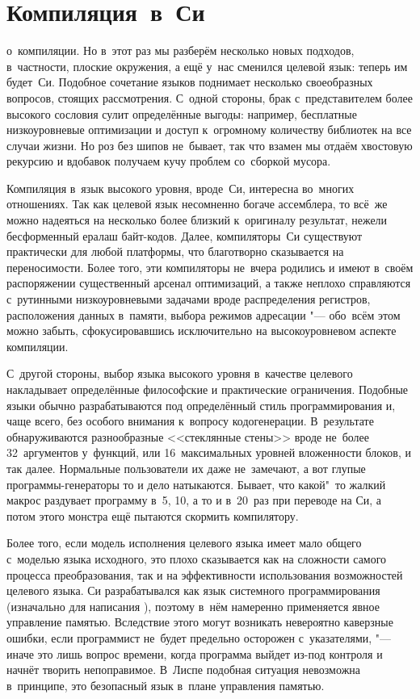 \chapter{Компиляция~в~Си}\label{chapter:cc}

 о~компиляции. Но в~этот
раз мы разберём несколько новых подходов, в~частности, плоские окружения, а ещё
у~нас сменился целевой язык: теперь им будет~Си. Подобное сочетание языков
поднимает несколько своеобразных вопросов, стоящих рассмотрения. С~одной
стороны, брак с~представителем более высокого сословия сулит определённые
выгоды: например, бесплатные низкоуровневые оптимизации и доступ к~огромному
количеству библиотек на все случаи жизни. Но роз без шипов не~бывает, так что
взамен мы отдаём хвостовую рекурсию и вдобавок получаем кучу проблем со~сборкой
мусора.

\bigskip

Компиляция в~язык высокого уровня, вроде~Си, интересна во~многих отношениях. Так
как целевой язык несомненно богаче ассемблера, то всё~же можно надеяться на
несколько более близкий к~оригиналу результат, нежели бесформенный ералаш
байт-кодов. Далее, компиляторы~Си существуют практически для любой платформы,
что благотворно сказывается на переносимости. Более того, эти компиляторы
не~вчера родились и имеют в~своём распоряжении существенный арсенал оптимизаций,
а также неплохо справляются с~рутинными низкоуровневыми задачами вроде
распределения регистров, расположения данных в~памяти, выбора режимов адресации
"--- обо~всём этом можно забыть, сфокусировавшись исключительно на
высокоуровневом аспекте компиляции.

С~другой стороны, выбор языка высокого уровня в~качестве целевого накладывает
определённые философские и практические ограничения. Подобные языки обычно
разрабатываются под определённый стиль программирования и, чаще всего, без
особого внимания к~вопросу кодогенерации. В~результате обнаруживаются
разнообразные <<стеклянные стены>> вроде не~более 32~аргументов у~функций, или
16~максимальных уровней вложенности блоков, и так далее. Нормальные пользователи
их даже не~замечают, а вот глупые программы-генераторы то и дело натыкаются.
Бывает, что какой"~то жалкий макрос раздувает программу в~5, 10, а то и в~20~раз
при переводе на Си, а потом этого монстра ещё пытаются скормить компилятору.

Более того, если модель исполнения целевого языка имеет мало общего с~моделью
языка исходного, это плохо сказывается как на сложности самого процесса
преобразования, так и на эффективности использования возможностей целевого
языка. Си разрабатывался как язык системного программирования (изначально для
написания \UNIX), поэтому в~нём намеренно применяется явное управление памятью.
Вследствие этого могут возникать невероятно каверзные ошибки, если программист
не~будет предельно осторожен с~указателями, "--- иначе это лишь вопрос времени,
когда программа выйдет из-под контроля и начнёт творить непоправимое. В~Лиспе
подобная ситуация невозможна в~принципе, это безопасный язык в~плане управления
памятью.

